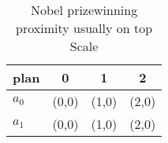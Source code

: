 \documentclass[a4paper]{article}
\begin{document}
\begin{table}
\begin{adjustbox}{width=0.6\columnwidth}
\begin{tabular}{|l|l|l|l|}
\hline
\textbf{plan} & \multicolumn{1}{c|}{\textbf{0}} & \multicolumn{1}{c|}{\textbf{1}} & \multicolumn{1}{c|}{\textbf{2}} \\ \hline
\textbf{$a_0$}  & (0,0) & (1,0) & (2,0) \\ \hline
\textbf{$a_1$}  & (0,0) & (1,0) & (2,0) \\ \hline
\end{tabular}
\end{adjustbox}
\caption{Nobel prizewinning proximity usually on top Scale
}
\end{table}
\end{document}
